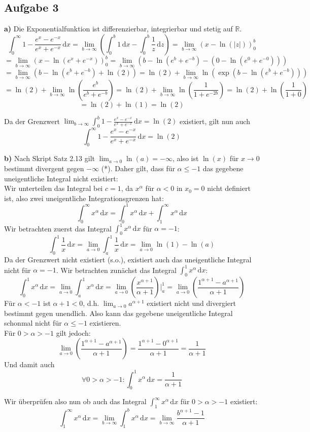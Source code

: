\documentclass[a4paper,graphics,11pt]{article}
\newcommand{\aufgabe}[1]{\subsection*{Aufgabe #1}}
\begin{document}
\newpage
\aufgabe{3}
\textbf{a)}
Die Exponentialfunktion ist differenzierbar, integrierbar und stetig auf $\mathbb{R}$.\\
$$
	\int_{0}^{\infty} 1-\frac{e^x-e^{-x}}{e^x+e^{-x}}\, \mathrm{d}x
	= \lim_{b \to \infty}\left( \int_{0}^{b} 1\, \mathrm{d}x -\int_0^b \frac{1}{z}\, \mathrm{d}z\right)
	= \lim_{b \to \infty}\left(x-\ln(|z|)\right)_0^b
$$$$
	= \lim_{b \to \infty}\left(x-\ln(e^x+e^{-x})\right)_0^b
	= \lim_{b \to \infty}\left(b-\ln(e^b+e^{-b}) - (0 -\ln(e^0+e^{-0}))\right)
$$$$
	= \lim_{b \to \infty}\left(b-\ln(e^b+e^{-b}) +\ln(2)\right)
	= \ln(2) + \lim_{b \to \infty} \ln\left(\exp\left(b-\ln(e^b+e^{-b})\right)\right)
$$$$
	= \ln(2) + \lim_{b \to \infty} \ln\left(\frac{e^b}{e^b+e^{-b}}\right)
	= \ln(2) + \lim_{b \to \infty} \ln\left(\frac{1}{1+e^{-2b}}\right)
	= \ln(2) + \ln\left(\frac{1}{1+0}\right)
$$$$
	= \ln(2) + \ln(1) = \ln(2)
$$

Da der Grenzwert $\displaystyle\lim_{b \to \infty} \int_{0}^{b} 1-\frac{e^x-e^{-x}}{e^x+e^{-x}}\, \mathrm{d}x = \ln(2)$
existiert, gilt nun auch
$$
	\int_{0}^{\infty} 1-\frac{e^x-e^{-x}}{e^x+e^{-x}}\, \mathrm{d}x = \ln(2)
$$

\textbf{b)}
Nach Skript Satz 2.13 gilt $\lim_{a \to 0} \ln(a) = -\infty$, also ist $\ln(x)$ für $x\to 0$ bestimmt divergent
gegen $-\infty$ (*). Daher gilt, dass für $\alpha \leq -1$ das gegebene uneigentliche Integral nicht existiert:\\
Wir unterteilen das Integral bei $c=1$, da $x^\alpha$ für $\alpha <0$ in $x_0=0$ nicht definiert ist, also zwei
uneigentliche Integrationsgrenzen hat:
$$
	\int_{0}^{\infty} x^\alpha\, \mathrm{d}x
	= \int_{0}^{1} x^\alpha\, \mathrm{d}x + \int_{1}^{\infty} x^\alpha\, \mathrm{d}x
$$
Wir betrachten zuerst das Integral $\int_{0}^{1} x^\alpha\, \mathrm{d}x$ für $\alpha = -1$:
$$
	\int_{0}^{1} \frac{1}{x}\, \mathrm{d}x
	= \lim_{a \to 0} \int_{a}^{1} \frac{1}{x}\, \mathrm{d}x
	= \lim_{a \to 0} \ln(1)-\ln(a)
$$
Da der Grenzwert nicht existiert (s.o.), existiert auch das uneigentliche Integral nicht für $\alpha = -1$.
Wir betrachten zunächst das Integral $\int_{0}^{1} x^\alpha\, \mathrm{d}x$:
$$
	\int_{0}^{1} x^\alpha\, \mathrm{d}x
	= \lim_{a \to 0} \int_{a}^{1} x^\alpha\, \mathrm{d}x
	= \lim_{a \to 0} \left(\frac{x^{\alpha+1}}{\alpha+1}\right)\bigg|_a^1
	= \lim_{a \to 0} \left(\frac{1^{\alpha+1}-a^{\alpha+1}}{\alpha+1}\right)
$$
Für $\alpha < -1$ ist $\alpha+1 < 0$, d.h. $\lim_{a \to 0}\limits a^{\alpha+1}$ existiert nicht und
divergiert bestimmt gegen unendlich. Also kann das gegebene uneigentliche Integral schonmal
nicht für $\alpha \leq -1$ existieren.\\
Für $0 > \alpha > -1$ gilt jedoch:
$$
	\lim_{a \to 0} \left(\frac{1^{\alpha+1}-a^{\alpha+1}}{\alpha+1}\right)
	= \frac{1^{\alpha+1}-0^{\alpha+1}}{\alpha+1}
	= \frac{1}{\alpha+1}
$$
Und damit auch
$$
	\forall 0 > \alpha > -1\colon \int_{0}^{1} x^\alpha\, \mathrm{d}x = \frac{1}{\alpha+1}
$$
\newpage

Wir überprüfen also nun ob auch das Integral $\int_{1}^{\infty} x^\alpha\, \mathrm{d}x$ für
$0 > \alpha > -1$ existiert:
$$
	\int_{1}^{\infty} x^\alpha\, \mathrm{d}x
	= \lim_{b \to \infty} \int_{1}^{b} x^\alpha\, \mathrm{d}x
	= \lim_{b \to \infty} \frac{b^{\alpha+1}-1}{\alpha+1}
$$
\end{document}
